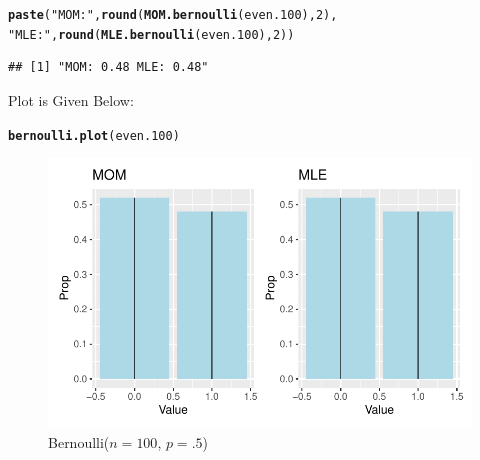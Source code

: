 \documentclass{article}\usepackage[]{graphicx}\usepackage[]{color}
\makeatletter
\def\maxwidth{ %
  \ifdim\Gin@nat@width>\linewidth
    \linewidth
  \else
    \Gin@nat@width
  \fi
}
\newcommand{\hlnum}[1]{\textcolor[rgb]{0.686,0.059,0.569}{#1}}%
\newcommand{\hlstr}[1]{\textcolor[rgb]{0.192,0.494,0.8}{#1}}%
\newcommand{\hlstd}[1]{\textcolor[rgb]{0.345,0.345,0.345}{#1}}%
\newcommand{\hlkwd}[1]{\textcolor[rgb]{0.737,0.353,0.396}{\textbf{#1}}}%
\newenvironment{kframe}{%
 \def\at@end@of@kframe{}%
 \ifinner\ifhmode%
  \def\at@end@of@kframe{\end{minipage}}%
  \begin{minipage}{\columnwidth}%
 \fi\fi%
 \def\FrameCommand##1{\hskip\@totalleftmargin \hskip-\fboxsep
 \colorbox{shadecolor}{##1}\hskip-\fboxsep
     \hskip-\linewidth \hskip-\@totalleftmargin \hskip\columnwidth}%
 \MakeFramed {\advance\hsize-\width
   \@totalleftmargin\z@ \linewidth\hsize
   \@setminipage}}%
 {\par\unskip\endMakeFramed%
 \at@end@of@kframe}
\newenvironment{knitrout}{}{} %
\makeatother
\begin{document}
\begin{enumerate}
\begin{enumerate}
\begin{knitrout}
\begin{kframe}
\begin{alltt}
\hlkwd{paste}\hlstd{(}\hlstr{"MOM:"}\hlstd{,} \hlkwd{round}\hlstd{(}\hlkwd{MOM.bernoulli}\hlstd{(even.100),}\hlnum{2}\hlstd{),}
      \hlstr{"MLE:"}\hlstd{,} \hlkwd{round}\hlstd{(}\hlkwd{MLE.bernoulli}\hlstd{(even.100),} \hlnum{2}\hlstd{))}
\end{alltt}
\begin{verbatim}
## [1] "MOM: 0.48 MLE: 0.48"
\end{verbatim}
\end{kframe}
\end{knitrout}
Plot is Given Below:
\begin{knitrout}
\color{fgcolor}\begin{kframe}
\begin{alltt}
\hlkwd{bernoulli.plot}\hlstd{(even.100)}
\end{alltt}
\end{kframe}
\end{knitrout}
\begin{figure}[H]
  \begin{center}
\begin{knitrout}
\color{fgcolor}
\includegraphics[width=\maxwidth]{figure/unnamed-chunk-57-1} 
\end{knitrout}
    \caption{Bernoulli($n=100$, $p=.5$)}
    \label{p4plot5}%
  \end{center}
\end{figure}

\end{enumerate}
\end{enumerate}
\end{document}
